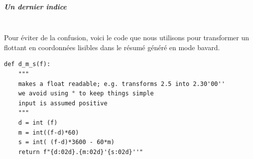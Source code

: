     \hypertarget{un-dernier-indice}{%
\subparagraph{Un dernier indice\\\\}\label{un-dernier-indice}}

    Pour éviter de la confusion, voici le code que nous utilisons pour
transformer un flottant en coordonnées lisibles dans le résumé généré en
mode bavard.

    \begin{verbatim}
def d_m_s(f):
    """
    makes a float readable; e.g. transforms 2.5 into 2.30'00'' 
    we avoid using ° to keep things simple
    input is assumed positive
    """
    d = int (f)
    m = int((f-d)*60)
    s = int( (f-d)*3600 - 60*m)
    return f"{d:02d}.{m:02d}'{s:02d}''"
\end{verbatim}